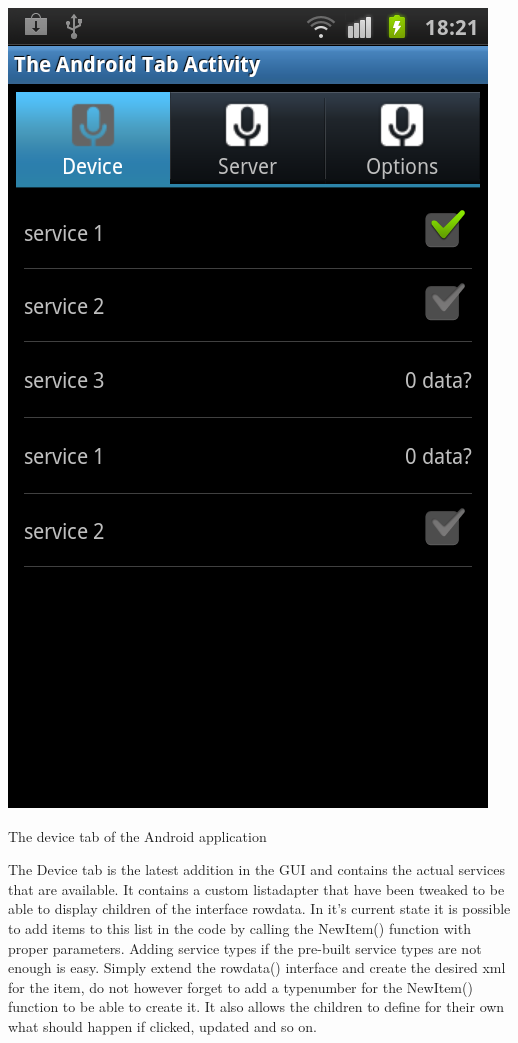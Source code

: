  \includegraphics[scale=0.75]{android-device.png}\caption{The device tab of the Android application}
The Device tab is the latest addition in the GUI and contains the actual services that are available. It contains a custom listadapter that have been tweaked to be able to display children of the interface rowdata.
In it's current state it is possible to add items to this list in the code by calling the NewItem() function with proper parameters. Adding service types if the pre-built service types are not enough is easy. 
Simply extend the rowdata() interface and create the desired xml for the item, do not however forget to add a typenumber for the NewItem() function to be able to create it. 
It also allows the children to define for their own what should happen if clicked, updated and so on.






